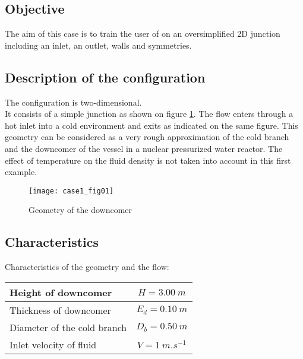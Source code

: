         \subsection{Objective}
The aim of this case is to train the user of \CS on an oversimplified 2D junction
including an inlet, an outlet, walls and symmetries.

        \subsection{Description of the configuration}

The configuration is two-dimensional.\\
It consists of a simple junction as shown on figure \ref{figante11}.
The flow enters through a hot inlet into a cold
environment and exits as indicated on the same figure. This geometry can be
considered as a very rough approximation of the cold branch and the downcomer of
the vessel in a nuclear pressurized water reactor. The effect of temperature on
the fluid density is not taken into account in this first example.

\begin{figure}[h!]
\begin{center}
\texttt{[image: case1\_fig01]}
\caption{Geometry of the downcomer}
\label{figante11}
\end{center}
\end{figure}


        \subsection{Characteristics}

Characteristics of the geometry and the flow:
\begin{center}
\begin{tabular}{|l|c|}
\hline
Height of downcomer & $H = 3.00\ m$ \\
\hline
Thickness of downcomer & $E_{d} = 0.10\ m$ \\
\hline
Diameter of the cold branch & $D_{b} = 0.50\ m$ \\
\hline
Inlet velocity of fluid & $V = 1\ m.s^{-1}$ \\
\hline
\end{tabular}\\
\end{center}

